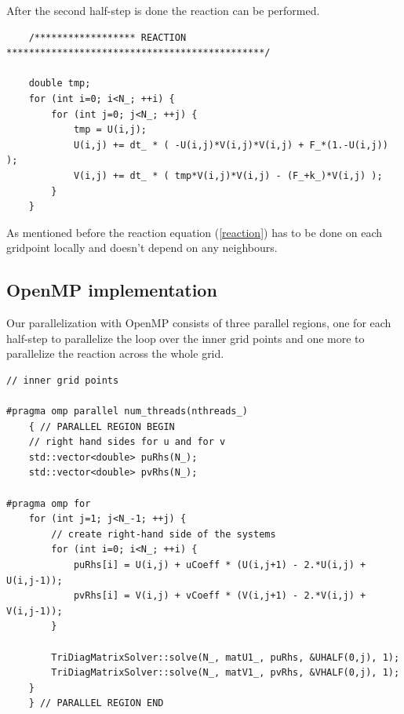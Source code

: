\documentclass[11pt,a4paper]{article} %
\begin{document}
After the second half-step is done the reaction can be performed.
\begin{center}
\begin{verbatim}
    /****************** REACTION **********************************************/

    double tmp;
    for (int i=0; i<N_; ++i) {
        for (int j=0; j<N_; ++j) {
            tmp = U(i,j);
            U(i,j) += dt_ * ( -U(i,j)*V(i,j)*V(i,j) + F_*(1.-U(i,j)) );
            V(i,j) += dt_ * ( tmp*V(i,j)*V(i,j) - (F_+k_)*V(i,j) );
        }
    }
\end{verbatim}
\end{center}

As mentioned before the reaction equation (\ref{reaction}) has to be done on each gridpoint locally and doesn't depend on any neighbours.

\subsection{OpenMP implementation}

Our parallelization with OpenMP consists of three parallel regions, one for each half-step to parallelize the loop over the inner grid points and one more to parallelize the reaction across the whole grid.

\begin{center}
\begin{verbatim}
// inner grid points

#pragma omp parallel num_threads(nthreads_)
    { // PARALLEL REGION BEGIN
    // right hand sides for u and for v
    std::vector<double> puRhs(N_);
    std::vector<double> pvRhs(N_);

#pragma omp for
    for (int j=1; j<N_-1; ++j) {
        // create right-hand side of the systems
        for (int i=0; i<N_; ++i) {
            puRhs[i] = U(i,j) + uCoeff * (U(i,j+1) - 2.*U(i,j) + U(i,j-1));
            pvRhs[i] = V(i,j) + vCoeff * (V(i,j+1) - 2.*V(i,j) + V(i,j-1));
        }
        
        TriDiagMatrixSolver::solve(N_, matU1_, puRhs, &UHALF(0,j), 1);
        TriDiagMatrixSolver::solve(N_, matV1_, pvRhs, &VHALF(0,j), 1);
    }
    } // PARALLEL REGION END
\end{verbatim}
\end{center}
\end{document}
